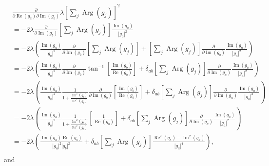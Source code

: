 \documentclass{article}
\newcommand\re{\operatorname{Re}}
\newcommand\im{\operatorname{Im}}
\begin{document}
\begin{align}
    &\frac{\partial}
    {\partial \re(g_a) \partial \im(g_b)} \lambda \left[ \sum_j \operatorname{Arg}(g_j) \right]^2 \\
    &= -2 \lambda \frac{\partial}{\partial \im(g_b)} \left[ \sum_j \operatorname{Arg}(g_j) \right] \frac{\im(g_a)}{|g_a|^2} \\
    &= -2 \lambda \left( \frac{\im(g_a)}{|g_a|^2} \frac{\partial}{\partial \im(g_b)} \left[ \sum_j \operatorname{Arg}(g_j) \right] + \left[ \sum_j \operatorname{Arg}(g_j) \right] \frac{\partial}{\partial \im(g_b)} \frac{\im(g_a)}{|g_a|^2}  \right) \\
    &= -2 \lambda \left( \frac{\im(g_a)}{|g_a|^2} \frac{\partial}{\partial \im(g_b)} \tan^{-1} \left[ \frac{\im(g_b)}{\re(g_b)} \right] + \delta_{ab} \left[ \sum_j \operatorname{Arg}(g_j) \right] \frac{\partial}{\partial \im(g_a)} \frac{\im(g_a)}{|g_a|^2}  \right) \\
    &= -2 \lambda \left( \frac{\im(g_a)}{|g_a|^2} \frac{1}{1+\frac{\im^2(g_b)}{\re^2(g_b)}} \frac{\partial}
    {\partial \im(g_b)} \left[ \frac{\im(g_b)}{\re(g_b)} \right] + \delta_{ab} \left[ \sum_j \operatorname{Arg}(g_j) \right] \frac{\partial}{\partial \im(g_a)} \frac{\im(g_a)}{|g_a|^2}  \right) \\
    &= -2 \lambda \left( \frac{\im(g_a)}{|g_a|^2} \frac{1}{1+\frac{\im^2(g_b)}{\re^2(g_b)}} \left[ \frac{1}{\re(g_b)} \right] + \delta_{ab} \left[ \sum_j \operatorname{Arg}(g_j) \right] \frac{\partial}{\partial \im(g_a)} \frac{\im(g_a)}{|g_a|^2}  \right) \\
    &= -2 \lambda \left( \frac{\im(g_a) \re(g_b)}{|g_a|^2 |g_b|^2} + \delta_{ab} \left[ \sum_j \operatorname{Arg}(g_j) \right] \frac{\re^2(g_a) - \im^2(g_a)}{|g_a|^4}  \right), \\
\end{align}
and
\end{document}
